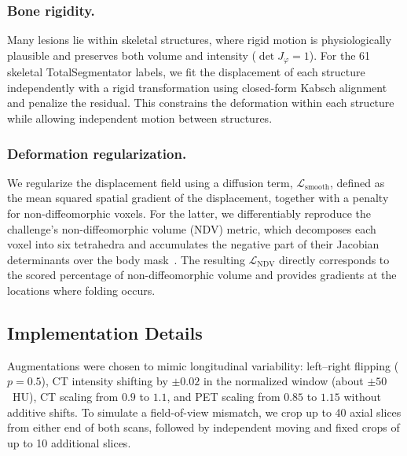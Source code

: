 


\subsubsection{Bone rigidity.}
Many lesions lie within skeletal structures, where rigid motion is physiologically plausible and preserves both volume and intensity ($\det J_{\varphi} = 1$).
For the 61 skeletal TotalSegmentator labels, we fit the displacement of each structure independently with a rigid transformation using closed-form Kabsch alignment~\cite{ref_kabsch,ref_umeyama} and penalize the residual.
This constrains the deformation within each structure while allowing independent motion between structures.


\subsubsection{Deformation regularization.}
We regularize the displacement field using a diffusion term, $\mathcal{L}_{\mathrm{smooth}}$, defined as the mean squared spatial gradient of the displacement, together with a penalty for non-diffeomorphic voxels.
For the latter, we differentiably reproduce the challenge's non-diffeomorphic volume (NDV) metric, which decomposes each voxel into six tetrahedra and accumulates the negative part of their Jacobian determinants over the body mask~\cite{Liu2024}.
The resulting $\mathcal{L}_{\mathrm{NDV}}$ directly corresponds to the scored percentage of non-diffeomorphic volume and provides gradients at the locations where folding occurs.




\subsection{Implementation Details}
\label{sec:infrastructure}
Augmentations were chosen to mimic longitudinal variability: left--right flipping ($p=0.5$), CT intensity shifting by $\pm0.02$ in the normalized window (about $\pm50$~HU), CT scaling from $0.9$ to $1.1$, and PET scaling from $0.85$ to $1.15$ without additive shifts.
To simulate a field-of-view mismatch, we crop up to 40 axial slices from either end of both scans, followed by independent moving and fixed crops of up to 10 additional slices.

